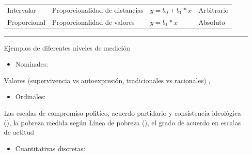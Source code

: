 \documentclass[]{book}
\providecommand{\tightlist}{%
  \setlength{\itemsep}{0pt}\setlength{\parskip}{0pt}}
\begin{document}
\begin{longtable}[]{@{}llll@{}}
\begin{minipage}[t]{0.14\columnwidth}
Intervalar\strut
\end{minipage} & \begin{minipage}[t]{0.29\columnwidth}\raggedright
Proporcionalidad de distancias\strut
\end{minipage} & \begin{minipage}[t]{0.32\columnwidth}\raggedright
\(y = b_0 + b_1*x\)\strut
\end{minipage} & \begin{minipage}[t]{0.14\columnwidth}\raggedright
Arbitrario\strut
\end{minipage}\tabularnewline
\begin{minipage}[t]{0.14\columnwidth}\raggedright
Proporcional\strut
\end{minipage} & \begin{minipage}[t]{0.29\columnwidth}\raggedright
Proporcionalidad de valores\strut
\end{minipage} & \begin{minipage}[t]{0.32\columnwidth}\raggedright
\(y = b_1*x\)\strut
\end{minipage} & \begin{minipage}[t]{0.14\columnwidth}\raggedright
Absoluto\strut
\end{minipage}\tabularnewline
\bottomrule
\end{longtable}

\begin{center}\rule{0.5\linewidth}{\linethickness}\end{center}

Ejemplos de diferentes niveles de medición

\begin{itemize}
\tightlist
\item
  Nominales:
\end{itemize}

Valores (supervivencia vs autoexpresión, tradicionales vs racionales) \citet{Inglehart2018}, \citet{Norris2011}

\begin{itemize}
\tightlist
\item
  Ordinales:
\end{itemize}

Las escalas de compromiso politico, acuerdo partidario y consistencia ideológica (\citet{Doherty2016}), la pobreza medida según Línea de pobreza (\citet{INDEC2016}), el grado de acuerdo en escalas de actitud \citet{Robinson2014}

\begin{itemize}
\tightlist
\item
  Cuantitativas discretas:
\end{itemize}
\end{document}
